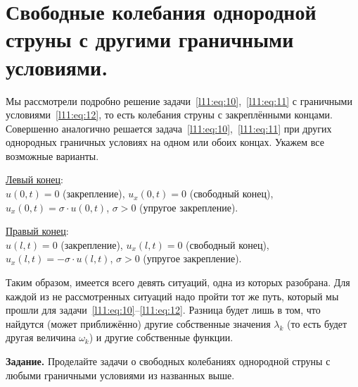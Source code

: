 \documentclass[12pt,a4paper,openany,fleqn]{book}
\theoremstyle{definition}
\begin{document}
\section[Свободные колебания однородной струны с другими г. у.]{Свободные колебания однородной струны с другими граничными условиями.}
\label{lecture11section4}
Мы рассмотрели подробно решение задачи~\eqref{l11:eq:10},~\eqref{l11:eq:11} с граничными условиями~\eqref{l11:eq:12}, то есть колебания струны с закреплёнными концами. Совершенно аналогично решается задача~\eqref{l11:eq:10},~\eqref{l11:eq:11} при других однородных граничных условиях на одном или обоих концах. Укажем все возможные варианты.
\vspace{0,4cm}

\noindent\underline{Левый конец}:\\[4pt]
$u(0,t)=0$ (закрепление), $u_x(0,t)=0$ (свободный конец), $u_x(0,t)=\sigma\cdot u(0,t)$, $\sigma>0$ (упругое закрепление).
\vspace{0,2cm}

\noindent\underline{Правый конец}:\\[4pt]  
$u(l,t)=0$ (закрепление), $u_x(l,t)=0$ (свободный конец), $u_x(l,t)=-\sigma\cdot u(l,t)$, $\sigma>0$ (упругое закрепление).
\vspace{0,4cm}

Таким образом, имеется всего девять ситуаций, одна из которых разобрана. Для каждой из не рассмотренных ситуаций надо пройти тот же путь, который мы прошли для задачи~\eqref{l11:eq:10}--\eqref{l11:eq:12}. Разница будет лишь в том, что найдутся (может приближённо) другие собственные значения $\lambda_k$  (то есть будет другая величина $\omega_k$) и другие собственные функции.
\vspace{0,2cm}

\noindent\textbf{Задание. }Проделайте задачи о свободных колебаниях однородной струны с любыми граничными условиями из названных выше.
\end{document}
